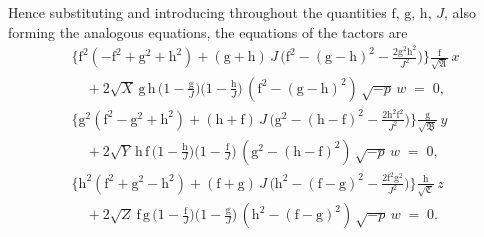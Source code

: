 \documentclass[11pt]{article}
\providecommand{\fA}{\mathfrak{A}}
\providecommand{\fB}{\mathfrak{B}}
\providecommand{\fC}{\mathfrak{C}}
\begin{document}
Hence substituting and introducing throughout the quantities $\mathrm{f}$, $\mathrm{g}$, $\mathrm{h}$, $J$, also forming the analogous equations, the equations of the tactors are
\begin{align*}
&\bigl\{\mathrm{f}^{2}(-\mathrm{f}^{2} + \mathrm{g}^{2} + \mathrm{h}^{2}) + (\mathrm{g} + \mathrm{h})\,J\,\bigl(\mathrm{f}^{2} - (\mathrm{g} - \mathrm{h})^{2} - \tfrac{2\mathrm{g}^{2}\mathrm{h}^{2}}{J^{2}}\bigr)\bigr\}\tfrac{\mathrm{f}}{\sqrt{\fA}}\,x \\
&\quad + 2\sqrt{X}\,\mathrm{g}\,\mathrm{h}\,\bigl(1 - \tfrac{\mathrm{g}}{J}\bigr)\bigl(1 - \tfrac{\mathrm{h}}{J}\bigr)\,(\mathrm{f}^{2} - (\mathrm{g} - \mathrm{h})^{2})\,\sqrt{-p}\,w \;=\; 0,\\[0.5em]
&\bigl\{\mathrm{g}^{2}(\mathrm{f}^{2} - \mathrm{g}^{2} + \mathrm{h}^{2}) + (\mathrm{h} + \mathrm{f})\,J\,\bigl(\mathrm{g}^{2} - (\mathrm{h} - \mathrm{f})^{2} - \tfrac{2\mathrm{h}^{2}\mathrm{f}^{2}}{J^{2}}\bigr)\bigr\}\tfrac{\mathrm{g}}{\sqrt{\fB}}\,y \\
&\quad + 2\sqrt{Y}\,\mathrm{h}\,\mathrm{f}\,\bigl(1 - \tfrac{\mathrm{h}}{J}\bigr)\bigl(1 - \tfrac{\mathrm{f}}{J}\bigr)\,(\mathrm{g}^{2} - (\mathrm{h} - \mathrm{f})^{2})\,\sqrt{-p}\,w \;=\; 0,\\[0.5em]
&\bigl\{\mathrm{h}^{2}(\mathrm{f}^{2} + \mathrm{g}^{2} - \mathrm{h}^{2}) + (\mathrm{f} + \mathrm{g})\,J\,\bigl(\mathrm{h}^{2} - (\mathrm{f} - \mathrm{g})^{2} - \tfrac{2\mathrm{f}^{2}\mathrm{g}^{2}}{J^{2}}\bigr)\bigr\}\tfrac{\mathrm{h}}{\sqrt{\fC}}\,z \\
&\quad + 2\sqrt{Z}\,\mathrm{f}\,\mathrm{g}\,\bigl(1 - \tfrac{\mathrm{f}}{J}\bigr)\bigl(1 - \tfrac{\mathrm{g}}{J}\bigr)\,(\mathrm{h}^{2} - (\mathrm{f} - \mathrm{g})^{2})\,\sqrt{-p}\,w \;=\; 0.
\end{align*}

\bigskip
\end{document}
